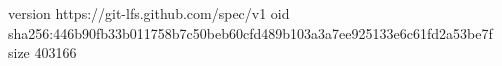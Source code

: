version https://git-lfs.github.com/spec/v1
oid sha256:446b90fb33b011758b7c50beb60cfd489b103a3a7ee925133e6c61fd2a53be7f
size 403166
